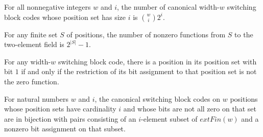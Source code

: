 \begin{theorem}
\label{FABL.SwitchingBlockCode.card_finalOfSize}
\leanok
{}
For all nonnegative integers $w$ and $i$, the number of canonical width-$w$ switching
block codes whose position set has size $i$ is $\binom{w}{i}2^i$.
\end{theorem}

\begin{theorem}
\label{FABL.SwitchingBlockCode.card_nonzero_positionBits}
\leanok
{}
For any finite set $S$ of positions, the number of nonzero functions from $S$ to the
two-element field is $2^{|S|}-1$.
\end{theorem}

\begin{theorem}
\label{FABL.SwitchingBlockCode.nonzero_iff_restrictBits_ne_zero}
\leanok
{}
For any width-$w$ switching block code, there is a position in its position set with bit
$1$ if and only if the restriction of its bit assignment to that position set is not the
zero function.
\end{theorem}

\begin{definition}
\label{FABL.SwitchingBlockCode.fullOfSizeEquiv}
\leanok
{}
For natural numbers $w$ and $i$, the canonical switching block codes on $w$ positions
whose position sets have cardinality $i$ and whose bits are not all zero on that set are
in bijection with pairs consisting of an $i$-element subset of $	ext{Fin}(w)$ and a
nonzero bit assignment on that subset.
\end{definition}

